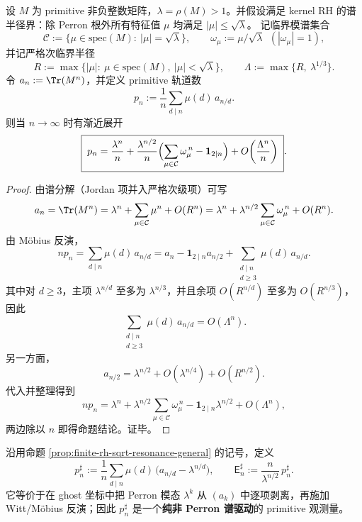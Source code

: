 \begin{proposition}[平方根项的相位共振公式：临界模谱与 \texorpdfstring{$d=2$}{d=2} 项的干涉]\label{prop:finite-rh-sqrt-resonance-general}
设 \(M\) 为 primitive 非负整数矩阵，\(\lambda=\rho(M)>1\)。并假设满足 kernel RH 的谱半径界：除 Perron 根外所有特征值 \(\mu\) 均满足 \(|\mu|\le \sqrt{\lambda}\)。
记临界模谱集合
\[
\mathcal{C}:=\{\mu\in\mathrm{spec}(M):\ |\mu|=\sqrt{\lambda}\},
\qquad
\omega_\mu:=\mu/\sqrt{\lambda}\ \ (|\omega_\mu|=1),
\]
并记严格次临界半径
\[
R:=\max\{|\mu|:\ \mu\in\mathrm{spec}(M),\ |\mu|<\sqrt{\lambda}\},
\qquad
\Lambda:=\max\{R,\ \lambda^{1/3}\}.
\]
令 \(a_n:=\Tr(M^n)\)，并定义 primitive 轨道数
\[
p_n:=\frac{1}{n}\sum_{d\mid n}\mu(d)\,a_{n/d}.
\]
则当 \(n\to\infty\) 时有渐近展开
\[
\boxed{\;
p_n
=\frac{\lambda^n}{n}
+\frac{\lambda^{n/2}}{n}\Bigl(\sum_{\mu\in\mathcal{C}}\omega_\mu^{\,n}-\mathbf{1}_{2\mid n}\Bigr)
+O\!\left(\frac{\Lambda^n}{n}\right)\; }.
\]
\end{proposition}
\begin{proof}
由谱分解（Jordan 项并入严格次级项）可写
\[
a_n=\Tr(M^n)=\lambda^n+\sum_{\mu\in\mathcal{C}}\mu^n+O(R^n)
=\lambda^n+\lambda^{n/2}\sum_{\mu\in\mathcal{C}}\omega_\mu^{\,n}+O(R^n).
\]
由 Möbius 反演，
\[
np_n=\sum_{d\mid n}\mu(d)\,a_{n/d}
=a_n-\mathbf{1}_{2\mid n}a_{n/2}+\sum_{\substack{d\mid n\\ d\ge 3}}\mu(d)\,a_{n/d}.
\]
其中对 \(d\ge 3\)，主项 \(\lambda^{n/d}\) 至多为 \(\lambda^{n/3}\)，并且余项 \(O(R^{n/d})\) 至多为 \(O(R^{n/3})\)，因此
\[
\sum_{\substack{d\mid n\\ d\ge 3}}\mu(d)\,a_{n/d}=O(\Lambda^n).
\]
另一方面，
\[
a_{n/2}=\lambda^{n/2}+O(\lambda^{n/4})+O(R^{n/2}).
\]
代入并整理得到
\[
np_n=\lambda^n+\lambda^{n/2}\sum_{\mu\in\mathcal{C}}\omega_\mu^{\,n}-\mathbf{1}_{2\mid n}\lambda^{n/2}+O(\Lambda^n),
\]
两边除以 \(n\) 即得命题结论。证毕。
\end{proof}

\begin{definition}\label{def:primitive-sharp}
沿用命题 \ref{prop:finite-rh-sqrt-resonance-general} 的记号，定义
\[
p_n^\sharp
:=\frac{1}{n}\sum_{d\mid n}\mu(d)\,\bigl(a_{n/d}-\lambda^{n/d}\bigr),
\qquad
\mathsf{E}_n^\sharp
:=\frac{n}{\lambda^{n/2}}\,p_n^\sharp.
\]
它等价于在 ghost 坐标中把 Perron 模态 \(\lambda^k\) 从 \((a_k)\) 中逐项剥离，再施加 Witt/Möbius 反演；因此 \(p_n^\sharp\) 是一个\textbf{纯非 Perron 谱驱动}的 primitive 观测量。
\end{definition}

